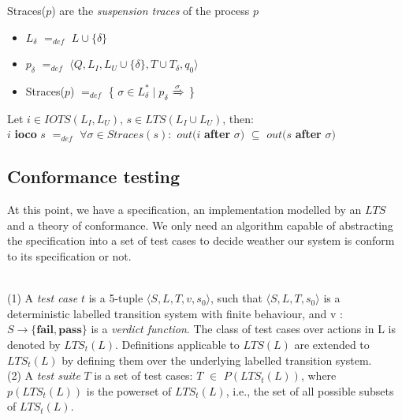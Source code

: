 \documentclass[a4paper]{report}
\begin{document}
\begin{definition}
Straces($p$) are the \textit{suspension traces} of the process $p$
\begin{itemize}
\item[] $L_{\delta}$ $=_{def}$ $L \cup \{\delta\}$
\item[] $p_{\delta}$ $=_{def}$ $\langle Q, L_I, L_U \cup \{\delta\}, T \cup T_{\delta}, q_0 \rangle$
\item[] Straces($p$) $=_{def}$ \{ $\sigma \in L_{\delta}^* \mid p_{\delta}$ $\xRightarrow{\sigma}$ \}
\end{itemize}

\end{definition}

\begin{definition}
Let $i \in IOTS(L_I, L_U)$, $s \in LTS(L_I \cup L_U)$, then:\\
$i$ \textbf{ioco} $s$ $=_{def}$ $ \forall \sigma \in Straces(s): $ $out(i$ \textbf{after} $\sigma) $ $\subseteq$ $out(s$ \textbf{after} $\sigma) $\\
\end{definition}



\subsection*{Conformance testing}
At this point, we have a specification, an implementation modelled by an $LTS$ and a theory of conformance. We only need an algorithm capable of abstracting the specification into a set of test cases to decide weather our system is conform to its specification or not.\\
\begin{definition}{$ $\\}
(1) A \textit{test case} $t$ is a 5-tuple $\langle S, L, T, v, s_0 \rangle$, such that $\langle S, L, T, s_0 \rangle$ is a deterministic labelled transition system with finite behaviour, and v : $S \rightarrow \{\textbf{fail}, \textbf{pass} \}$ is a \textit{verdict function}.
The class of test cases over actions in L is denoted by $LTS_t (L)$. Definitions applicable to $LTS(L)$ are extended to $LTS_t (L)$ by defining them over the underlying labelled transition system.\\
\newline
(2) A \textit{test suite} $T$ is a set of test cases: $T$ $\in$ $P(LTS_t (L))$, where $p(LTS_t (L))$ is the powerset of $LTS_t (L)$, i.e., the set of all possible subsets of $LTS_t (L)$.
\end{definition}
\end{document}
